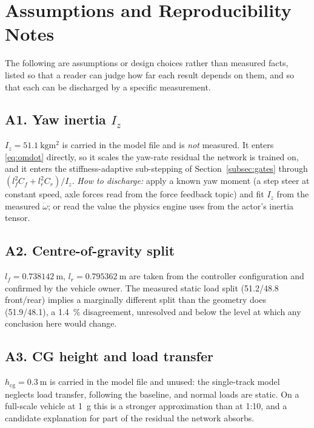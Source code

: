 \section{Assumptions and Reproducibility Notes}
\label{subsec:assumptions}

The following are assumptions or design choices rather than measured facts,
listed so that a reader can judge how far each result depends on them, and so
that each can be discharged by a specific measurement.

\subsection*{A1. Yaw inertia $I_{z}$}
$I_{z}=\SI{51.1}{\kilo\gram\meter\squared}$ is carried in the model file and
is \emph{not} measured. It enters \eqref{eq:omdot} directly, so it scales the
yaw-rate residual the network is trained on, and it enters the
stiffness-adaptive sub-stepping of Section~\ref{subsec:gates} through
$(l_{f}^{2}C_{f}+l_{r}^{2}C_{r})/I_{z}$. \emph{How to discharge:} apply a known
yaw moment (a step steer at constant speed, axle forces read from the force
feedback topic) and fit $I_{z}$ from the measured $\dot\omega$; or read the
value the physics engine uses from the actor's inertia tensor.

\subsection*{A2. Centre-of-gravity split}
$l_{f}=\SI{0.738142}{\meter}$, $l_{r}=\SI{0.795362}{\meter}$ are taken from
the controller configuration and confirmed by the vehicle owner. The measured
static load split (51.2/48.8 front/rear) implies a marginally different split
than the geometry does (51.9/48.1), a \SI{1.4}{\percent} disagreement,
unresolved and below the level at which any conclusion here would change.

\subsection*{A3. CG height and load transfer}
$h_{\mathrm{cg}}=\SI{0.3}{\meter}$ is carried in the model file and unused:
the single-track model neglects load transfer, following the baseline, and
normal loads are static. On a full-scale vehicle at \SI{1}{\g} this is a
stronger approximation than at 1:10, and a candidate explanation for part of
the residual the network absorbs.

